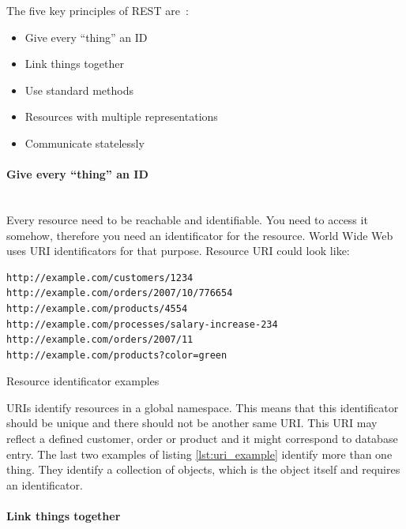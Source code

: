 The  five key principles of REST are~\cite{rest_brief_intro}:
\begin{itemize}
  
 \item Give every “thing” an ID
 \item Link things together
 \item Use standard methods
 \item Resources with multiple representations
 \item Communicate statelessly
  
\end{itemize}

\paragraph{Give every “thing” an ID}  ~\\

Every resource need to be reachable and identifiable. You need to access it
somehow, therefore you need an identificator for the resource. World Wide Web
uses \gls{URI} identificators for that purpose. Resource \gls{URI} could look like:

\begin{listing}[H]
\begin{verbatim}
http://example.com/customers/1234
http://example.com/orders/2007/10/776654
http://example.com/products/4554
http://example.com/processes/salary-increase-234 
http://example.com/orders/2007/11
http://example.com/products?color=green
\end{verbatim}
\caption{Resource identificator examples ~\cite{rest_brief_intro}}
\label{lst:uri_example}
\end{listing}

URIs identify resources in a global namespace. This means that this
identificator should be unique and there should not be another same URI.
This URI may reflect a defined customer, order or product and it might correspond
to database entry. The last two examples of listing \autoref{lst:uri_example} identify more
than one thing. They identify a collection of objects, which is the object
itself and requires an identificator.

\paragraph{Link things together}  ~\\

